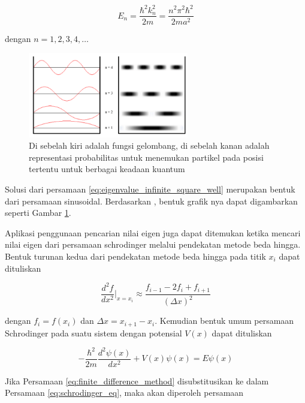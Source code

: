 \begin{equation} \label{eq:eigenvalue_infinite_square_well}
	E_n = \frac{\hbar^2 k_n^2}{2m} = \frac{n^2 \pi^2 \hbar^2}{2ma^2}
\end{equation}

dengan $n = 1, 2, 3, 4, \dots$

\begin{figure}[H]
	\centering
	\includegraphics[width=7cm]{images/solution_infinte_square_well.png}
	\caption{Di sebelah kiri adalah fungsi gelombang, di sebelah kanan adalah representasi probabilitas untuk menemukan partikel pada posisi tertentu untuk berbagai keadaan kuantum}
	\label{img:solution_infinite_square_well}
\end{figure}

\noindent
Solusi dari persamaan \ref{eq:eigenvalue_infinite_square_well} merupakan bentuk dari
persamaan sinusoidal. Berdasarkan \cite{dalessandrisSpiralModernPhysics2024},
bentuk grafik nya dapat digambarkan seperti Gambar \ref{img:solution_infinite_square_well}.

Aplikasi penggunaan pencarian nilai eigen juga dapat ditemukan ketika mencari nilai eigen dari persamaan schrodinger melalui pendekatan metode beda hingga. Bentuk turunan kedua dari pendekatan metode beda hingga pada titik $x_i$ dapat dituliskan

\begin{equation} \label{eq:finite_difference_method}
	\frac{d^2 f}{dx^2} \bigg|_{x=x_i} \approx \frac{f_{i-1} - 2f_i + f_{i+1}}{(\Delta x)^2}
\end{equation}

\noindent
dengan \( f_i = f(x_i) \) dan \( \Delta x = x_{i+1} - x_i \). Kemudian bentuk umum persamaan Schrodinger pada suatu sistem dengan potensial $V(x)$ dapat dituliskan

\begin{equation} \label{eq:schrodinger_eq}
	-\frac{\hbar^2}{2m} \frac{d^2 \psi(x)}{dx^2} + V(x) \psi(x) = E \psi(x)
\end{equation}

Jika Persamaan \ref{eq:finite_difference_method} disubstitusikan ke dalam Persamaan \ref{eq:schrodinger_eq}, maka akan diperoleh persamaan

